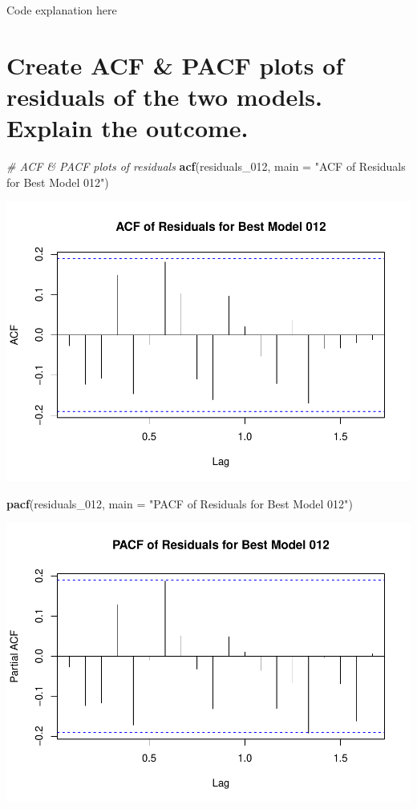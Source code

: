 \documentclass[
]{book}
\newenvironment{Shaded}{\begin{snugshade}}{\end{snugshade}}
\newcommand{\AttributeTok}[1]{\textcolor[rgb]{0.13,0.29,0.53}{#1}}
\newcommand{\CommentTok}[1]{\textcolor[rgb]{0.56,0.35,0.01}{\textit{#1}}}
\newcommand{\FunctionTok}[1]{\textcolor[rgb]{0.13,0.29,0.53}{\textbf{#1}}}
\newcommand{\NormalTok}[1]{#1}
\newcommand{\StringTok}[1]{\textcolor[rgb]{0.31,0.60,0.02}{#1}}
\begin{document}
Code explanation here

\section{Create ACF \& PACF plots of residuals of the two models. Explain the outcome.}\label{create-acf-pacf-plots-of-residuals-of-the-two-models.-explain-the-outcome.}

\begin{Shaded}
\begin{Highlighting}[]
\CommentTok{\# ACF \& PACF plots of residuals}
\FunctionTok{acf}\NormalTok{(residuals\_012, }\AttributeTok{main =} \StringTok{"ACF of Residuals for Best Model 012"}\NormalTok{)}
\end{Highlighting}
\end{Shaded}

\includegraphics{bookdown-demo_files/figure-latex/unnamed-chunk-50-1.pdf}

\begin{Shaded}
\begin{Highlighting}[]
\FunctionTok{pacf}\NormalTok{(residuals\_012, }\AttributeTok{main =} \StringTok{"PACF of Residuals for Best Model 012"}\NormalTok{)}
\end{Highlighting}
\end{Shaded}

\includegraphics{bookdown-demo_files/figure-latex/unnamed-chunk-50-2.pdf}
\end{document}
